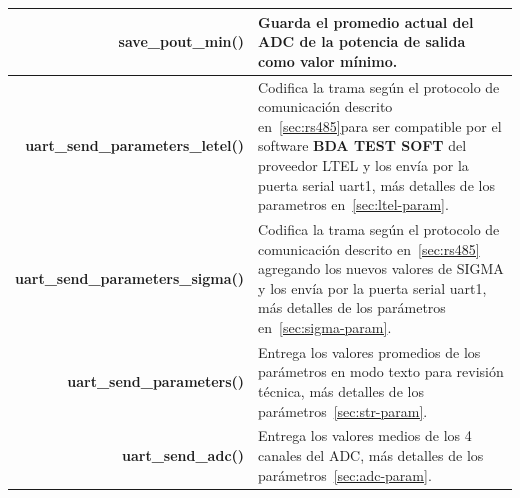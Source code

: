 \documentclass[12pt,twoside,onecolumn]{article}
\begin{document}
\begin{center}
\begin{tabular}{||r |m{10cm}| ||}
\textbf{save\_pout\_min()} & Guarda el promedio actual del ADC de la potencia de salida como valor mínimo. \\ \hline
\textbf{uart\_send\_parameters\_letel()} & Codifica la trama según el protocolo de comunicación descrito en~\ref{sec:rs485}para ser compatible por el software \textbf{BDA TEST SOFT} del proveedor LTEL y los envía por la puerta serial uart1, más detalles de los parametros en~\ref{sec:ltel-param}. \\ \hline
\textbf{uart\_send\_parameters\_sigma()} & Codifica la trama según el protocolo de comunicación descrito en~\ref{sec:rs485} agregando los nuevos valores de SIGMA y los envía por la puerta serial uart1, más detalles de los parámetros en~\ref{sec:sigma-param}. \\ \hline
\textbf{uart\_send\_parameters()} & Entrega los valores promedios de los parámetros en modo texto para revisión técnica,  más detalles de los parámetros~\ref{sec:str-param}. \\ \hline
\textbf{uart\_send\_adc()} & Entrega los valores medios de los 4 canales del ADC,  más detalles de los parámetros~\ref{sec:adc-param}. \\ \hline
\end{tabular}
\end{center}


\end{document}
